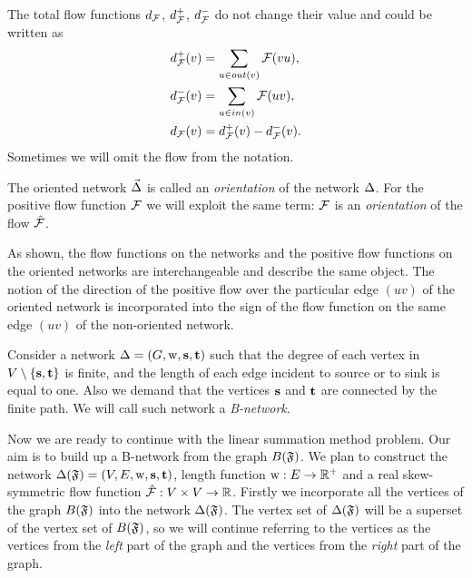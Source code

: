 \documentclass[12pt]{amsart}
\begin{document}
    The total flow functions $d_{\mathcal{F}}$, $d^{+}_{\mathcal{F}}$, $d^{-}_{\mathcal{F}}$ do not change their value and could be written as
    \begin{align*}
      &d^{+}_{\mathcal{F}}(v) = \sum_{u \in out(v)} \mathcal{F}(vu),\\
      &d^{-}_{\mathcal{F}}(v) = \sum_{u \in in(v)} \mathcal{F}(uv),\\
      &d_{\mathcal{F}}(v) = d^{+}_{\mathcal{F}}(v) - d^{-}_{\mathcal{F}}(v).
    \end{align*}
    Sometimes we will omit the flow from the notation.
    \begin{definition}
      The oriented network $\vec{\Delta}$ is called an \emph{orientation} of the network $\Delta$.
      For the positive flow function $\mathcal{F}$ we will exploit the same term:
        $\mathcal{F}$ is an \emph{orientation} of the flow $\mathcal{\hat{F}}$.
    \end{definition}
    \begin{remark}
      As shown, the flow functions on the networks and the positive flow functions on the oriented networks
        are interchangeable and describe the same object.
      The notion of the direction of the positive flow over the particular edge $(uv)$ of the oriented network
        is incorporated into the sign of the flow function on the same edge $(uv)$ of the non-oriented network.
    \end{remark}
    \begin{definition}
      Consider a network $\Delta = (G, \mathrm{w}, \mathbf{s}, \mathbf{t})$ such that
        the degree of each vertex in $V \setminus \{\mathbf{s}, \mathbf{t}\} $ is finite,
        and the length of each edge incident to source or to sink is equal to one.
      Also we demand that the vertices $\mathbf{s}$ and $\mathbf{t}$ are connected by the finite path.
      We will call such network a \emph{B-network}.
    \end{definition}
    Now we are ready to continue with the linear summation method problem.
    Our aim is to build up a B-network from the graph $B(\mathfrak{F})$.
    We plan to construct the network $\Delta(\mathfrak{F}) = (V, E, \mathrm{w}, \mathbf{s}, \mathbf{t})$,
      length function $\mathrm{w}: E \to \mathbb{R}^{+}$ and a real skew-symmetric flow function $\mathcal{\hat{F}}: V \times V \to \mathbb{R}$.
    Firstly we incorporate all the vertices of the graph $B(\mathfrak{F})$ into the network $\Delta(\mathfrak{F})$.
    The vertex set of $\Delta(\mathfrak{F})$ will be a superset of the vertex set of $B(\mathfrak{F})$,
      so we will continue referring to the vertices as the vertices from
      the \emph{left} part of the graph and the vertices from the \emph{right} part of the graph.
\end{document}
